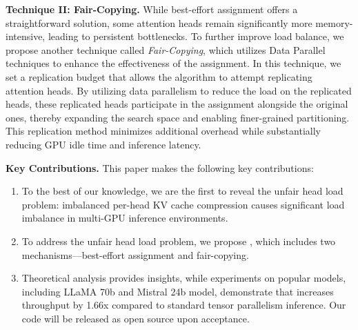 \noindent\textbf{Technique II: Fair-Copying.}
While best-effort assignment offers a straightforward solution, some attention heads remain significantly more memory-intensive, leading to persistent bottlenecks. 
%
To further improve load balance, we propose another technique called \emph{Fair-Copying}, which utilizes Data Parallel techniques to enhance the effectiveness of the assignment.
%
In this technique, we set a replication budget that allows the algorithm to attempt replicating attention heads. By utilizing data parallelism to reduce the load on the replicated heads, these replicated heads participate in the assignment alongside the original ones, thereby expanding the search space and enabling finer-grained partitioning. This replication method minimizes additional overhead while substantially reducing GPU idle time and inference latency.

\noindent\textbf{Key Contributions.}
This paper makes the following key contributions: 
\begin{enumerate} [label=\arabic*)]
\vspace{-0.1in}
\item To the best of our knowledge, we are the first to reveal the unfair head load problem: imbalanced per-head KV cache compression causes significant load imbalance in multi-GPU inference environments. 


\vspace{-0.1in}
\item To address the unfair head load problem,
we propose \AlgName{}, which includes two mechanisms—best-effort assignment and fair-copying.


\vspace{-0.1in}
\item Theoretical analysis provides insights, while experiments on popular models, including LLaMA 70b and Mistral 24b model, demonstrate that \AlgName{} increases throughput by 1.66x compared to standard tensor parallelism inference. Our code will be released as open source upon acceptance.
\end{enumerate}